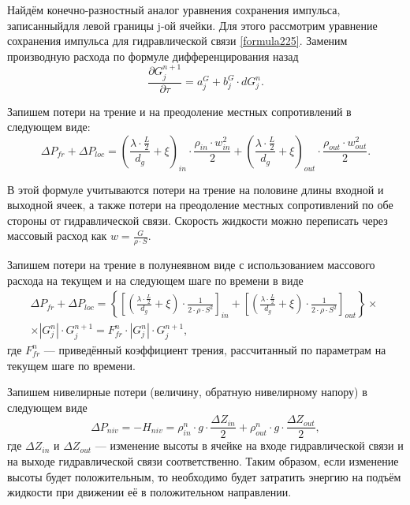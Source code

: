 
\label{sec:subsection42}
Найдём конечно-разностный аналог уравнения сохранения импульса, записанный\linebreak для левой границы j-ой ячейки. Для этого рассмотрим уравнение сохранения импульса для гидравлической связи \eqref{formula225}. Заменим производную расхода по формуле дифференцирования назад
\begin{equation}
\label{formula45}
\frac{\partial G_j^{n+1}}{\partial\tau}=a_j^G + b_j^G \cdot dG_j^n.
\end{equation}

Запишем потери на трение и на преодоление местных сопротивлений в следующем виде:
\begin{equation}
\label{formula46}
\Delta P_{fr}+\Delta P_{loc}=\left(\frac{\lambda\cdot\frac L 2}{d_g} + \xi
\right)_{in}\cdot \frac{\rho_{in}\cdot w_{in}^2}{2} + \left(\frac{\lambda\cdot\frac L 2}{d_g} + \xi
\right)_{out}\cdot \frac{\rho_{out}\cdot w_{out}^2}{2}.
\end{equation} 

В этой формуле учитываются потери на трение на половине длины входной и выходной ячеек, а также потери на преодоление местных сопротивлений по обе стороны от гидравлической связи. Скорость жидкости можно переписать через массовый расход как $w=\frac{G}{\rho\cdot S}$. 

Запишем потери на трение в полунеявном виде с использованием массового расхода на текущем и на следующем шаге по времени в виде
\begin{eqnarray}
\label{formula47}
\Delta P_{fr}+\Delta P_{loc}=\left\{\left[\left(\frac{\lambda\cdot\frac L 2}{d_g} + \xi \right)\cdot \frac{1}{2\cdot\rho\cdot S^2} \right]_{in} + \left[\left(\frac{\lambda\cdot\frac L 2}{d_g} + \xi \right)\cdot \frac{1}{2\cdot\rho\cdot S^2} \right]_{out} \right\} \times \nonumber ~\\
\times | G_j^n | \cdot G_j^{n+1}=F_{fr}^n\cdot | G_j^n | \cdot G_j^{n+1},
\end{eqnarray}
где $F_{fr}^n$ --- приведённый коэффициент трения, рассчитанный по параметрам на текущем шаге по времени.

Запишем нивелирные потери (величину, обратную нивелирному напору) в следующем виде
\begin{equation}
\label{formula48}
\Delta P_{niv}=-H_{niv}=\rho_{in}^n\cdot g \cdot \frac{\Delta Z_{in}}{2}+\rho_{out}^n\cdot g \cdot \frac{\Delta Z_{out}}{2},
\end{equation}
где $\Delta Z_{in}$ и $\Delta Z_{out}$ --- изменение высоты в ячейке на входе гидравлической связи и на выходе гидравлической связи соответственно. Таким образом, если изменение высоты будет положительным, то необходимо будет затратить энергию на подъём жидкости при движении её в положительном направлении. 

